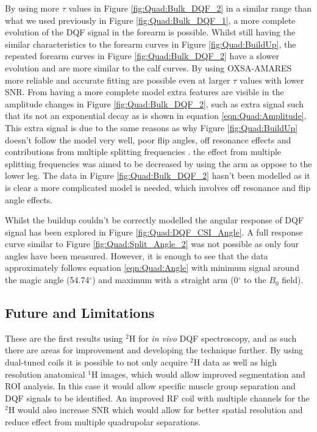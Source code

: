 \documentclass[class=article, crop=false]{standalone}
\begin{document}
By using more $\tau$ values in Figure \ref{fig:Quad:Bulk_DQF_2} in a similar range than what we used previously in Figure \ref{fig:Quad:Bulk_DQF_1}, a more complete evolution of the DQF signal in the forearm is possible. Whilst still having the similar characteristics to the forearm curves in Figure \ref{fig:Quad:BuildUp}, the repeated forearm curves in Figure \ref{fig:Quad:Bulk_DQF_2} have a slower evolution and are more similar to the calf curves. By using OXSA-AMARES \cite{Purvis2017OXSA:MATLAB} more reliable and accurate fitting are possible even at larger $\tau$ values with lower SNR. From having a more complete model extra features are visible in the amplitude changes in Figure \ref{fig:Quad:Bulk_DQF_2}, such as extra signal such that its not an exponential decay as is shown in equation \ref{eqn:Quad:Amplitude}. This extra signal is due to the same reasons as why Figure \ref{fig:Quad:BuildUp} doesn't follow the model very well, poor flip angles, off resonance effects and contributions from multiple splitting frequencies \cite{Sharf1995DetectionNMR-Spectroscopy}. the effect from multiple splitting frequencies was aimed to be decreased by using the arm as oppose to the lower leg. The data in Figure \ref{fig:Quad:Bulk_DQF_2} hasn't been modelled as it is clear a more complicated model is needed, which involves off resonance and flip angle effects.

Whilst the buildup couldn't be correctly modelled the angular response of DQF signal has been explored in Figure \ref{fig:Quad:DQF_CSI_Angle}. A full response curve similar to Figure \ref{fig:Quad:Split_Angle_2} was not possible as only four angles have been measured. However, it is enough to see that the data approximately follows equation \ref{eqn:Quad:Angle} with minimum signal around the magic angle (54.74$^\circ$) and maximum with a straight arm (0$^\circ$ to the $B_0$ field).

\subsection{Future and Limitations}

These are the first results using $^2$H for \textit{in vivo} DQF spectroscopy, and as such there are areas for improvement and developing the technique further. By using dual-tuned coils it is possible to not only acquire $^2$H data as well as high resolution anatomical $^1$H images, which would allow improved segmentation and ROI analysis. In this case it would allow specific muscle group separation and DQF signals to be identified. An improved RF coil with multiple channels for the $^2$H would also increase SNR which would allow for better spatial resolution and reduce effect from multiple quadrupolar separations.
\end{document}
